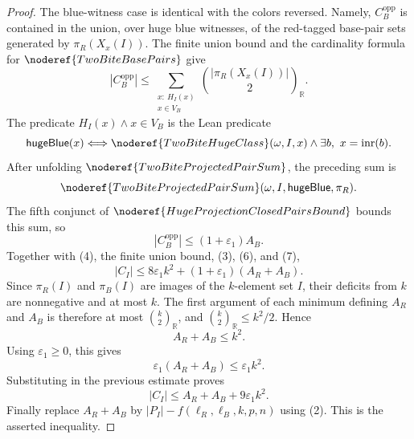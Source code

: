 \begin{proof}
The blue-witness case is identical with the colors reversed.  Namely,
\(C_B^{\mathrm{opp}}\) is contained in the union, over huge blue witnesses,
of the red-tagged base-pair sets generated by \(\pi_R(X_x(I))\).  The finite
union bound and the cardinality formula for
\(\noderef{TwoBiteBasePairs}\) give
\[
|C_B^{\mathrm{opp}}|
\le
\sum_{\substack{x:\ H_I(x)\\ x\in V_B}}
  \binom{|\pi_R(X_x(I))|}{2}_{\mathbb R}.
\]
The predicate \(H_I(x)\land x\in V_B\) is the Lean predicate
\[
\mathsf{hugeBlue}(x)\Longleftrightarrow
\noderef{TwoBiteHugeClass}(\omega,I,x)\land
\exists b,\ x=\operatorname{inr}(b).
\]
After unfolding \(\noderef{TwoBiteProjectedPairSum}\), the preceding sum is
\[
\noderef{TwoBiteProjectedPairSum}(\omega,I,\mathsf{hugeBlue},\pi_R).
\]
The fifth conjunct of \(\noderef{HugeProjectionClosedPairsBound}\) bounds
this sum, so
\[
|C_B^{\mathrm{opp}}|\le (1+\varepsilon_1)A_B. \tag{7}
\]
Together with (4), the finite union bound, (3), (6), and (7),
\[
|C_I|\le 8\varepsilon_1k^2+(1+\varepsilon_1)(A_R+A_B).
\]
Since \(\pi_R(I)\) and \(\pi_B(I)\) are images of the \(k\)-element set
\(I\), their deficits from \(k\) are nonnegative and at most \(k\).  The
first argument of each minimum defining \(A_R\) and \(A_B\) is therefore at
most \(\binom{k}{2}_{\mathbb R}\), and
\(\binom{k}{2}_{\mathbb R}\le k^2/2\).  Hence
\[
A_R+A_B\le k^2.
\]
Using \(\varepsilon_1\ge0\), this gives
\[
\varepsilon_1(A_R+A_B)\le \varepsilon_1k^2.
\]
Substituting in the previous estimate proves
\[
|C_I|\le A_R+A_B+9\varepsilon_1k^2.
\]
Finally replace \(A_R+A_B\) by \(|P_I|-f(\ell_R,\ell_B,k,p,n)\) using (2).
This is the asserted inequality.
\end{proof}
